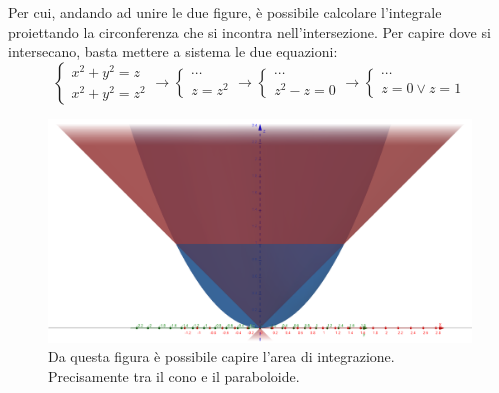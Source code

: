 \documentclass[a4paper]{article}
\begin{document}
	\noindent
	Per cui, andando ad unire le due figure, è possibile calcolare l'integrale proiettando la circonferenza che si incontra nell'intersezione. Per capire dove si intersecano, basta mettere a sistema le due equazioni:
	\begin{equation*}
		\begin{cases}
			x^{2} + y^{2} = z \\
			x^{2} + y^{2} = z^{2}
		\end{cases}
		\rightarrow
		\begin{cases}
			\cdots \\
			z = z^{2}
		\end{cases}
		\rightarrow
		\begin{cases}
			\cdots \\
			z^{2} - z = 0
		\end{cases}
		\rightarrow
		\begin{cases}
			\cdots \\
			z=0 \lor z=1
		\end{cases}
	\end{equation*}
	\begin{figure}[!htp]
		\centering
		\includegraphics[width=\textwidth]{img/integrazione_per_fili_3.png}
		\caption{Da questa figura è possibile capire l'area di integrazione. Precisamente tra il cono e il paraboloide.}
	\end{figure}
\end{document}
